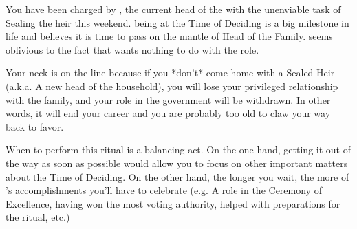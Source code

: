 \documentclass[green]{GL2020}
\begin{document}
\name{\gSealingFaledonHeir{}}

You have been charged by \cFaledonParent{\full}, the current head of the \cFaledonParent{\formal} with the unenviable task of Sealing the \cFaledonParent{\formal} heir this weekend. \cHeir{} being at the Time of Deciding is a big milestone in \cHeir{\their} life and \cFaledonParent{} believes it is time to pass on the mantle of Head of the Family. \cFaledonParent{} seems oblivious to the fact that \cHeir{} wants nothing to do with the role.

Your neck is on the line because if you *don’t* come home with a Sealed Heir (a.k.a. A new head of the \cFaledonParent{\formal} household), you will lose your privileged relationship with the family, and your role in the \pTech{} government will be withdrawn. In other words, it will end your career and you are probably too old to claw your way back to favor.

When to perform this ritual is a balancing act. On the one hand, getting it out of the way as soon as possible would allow you to focus on other important matters about the Time of Deciding. On the other hand, the longer you wait, the more of \cHeir{}'s accomplishments you'll have to celebrate (e.g. A role in the Ceremony of Excellence, having won the most voting authority, helped with preparations for the ritual, etc.)
\end{document}
